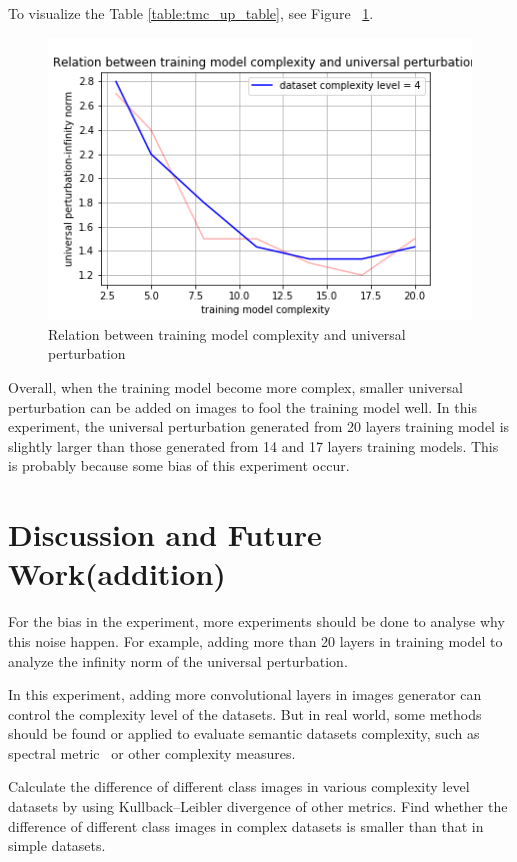 \documentclass{article}
\begin{document}
To visualize the Table \ref{table:tmc_up_table}, see Figure~ \ref{fig:tmc_up}.
\begin{figure}[h]
    \centering
    \includegraphics[width=1\linewidth]{tmc_up.png}
    \caption{\small Relation between training model complexity and universal perturbation}
    \label{fig:tmc_up}
\end{figure}

Overall, when the training model become more complex, smaller universal perturbation can be added on images to fool the training model well. In this experiment, the universal perturbation generated from 20 layers training model is slightly larger than those generated from 14 and 17 layers training models. This is probably because some bias of this experiment occur.

\section{Discussion and Future Work(addition)}
For the bias in the experiment, more experiments should be done to analyse why this noise happen. For example, adding more than 20 layers in training model to analyze the infinity norm of the universal perturbation.

In this experiment, adding more convolutional layers in images generator can control the complexity level of the datasets. But in real world, some methods should be found or applied to evaluate semantic datasets complexity, such as spectral metric~\cite{Branchaud-Charron_2019_CVPR} or other complexity measures.

Calculate the difference of different class images in various complexity level datasets by using Kullback–Leibler divergence of other metrics. Find whether the difference of different class images in complex datasets is smaller than that in simple datasets. 
\end{document}

